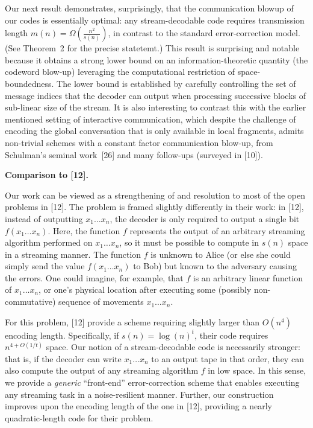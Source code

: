 \documentclass[10pt,a4paper]{article}
\begin{document}
Our next result demonstrates, surprisingly, that the communication blowup of our codes is essentially optimal: any stream-decodable code requires transmission length $m(n)=\Omega\left(\frac{n^{2}}{s(n)}\right)$, in contrast to the standard error-correction model. (See Theorem 2 for the precise statetemt.) This result is surprising and notable because it obtains a strong lower bound on an information-theoretic quantity (the codeword blow-up) leveraging the computational restriction of space-boundedness. The lower bound is established by carefully controlling the set of message indices that the decoder can output when processing successive blocks of sub-linear size of the stream. It is also interesting to contrast this with the earlier mentioned setting of interactive communication, which despite the challenge of encoding the global conversation that is only available in local fragments, admits non-trivial schemes with a constant factor communication blow-up, from Schulman’s seminal work [26] and many follow-ups (surveyed in [10]).\par





\par\medskip\noindent\textbf{Comparison to [12].}\par




Our work can be viewed as a strengthening of and resolution to most of the open problems in [12].
The problem is framed slightly differently in their work: in [12], instead of outputting $x_{1}\ldots x_{n}$, the decoder is only required to output a single bit $f(x_{1}\ldots x_{n})$. Here, the function $f$ represents the output of an arbitrary streaming algorithm performed on $x_{1}\ldots x_{n}$, so it must be possible to compute in $s(n)$ space in a streaming manner. The function $f$ is unknown to Alice (or else she could simply send the value $f(x_{1}\ldots x_{n})$ to Bob) but known to the adversary causing the errors. One could imagine, for example, that $f$ is an arbitrary linear function of $x_{1}\ldots x_{n}$, or one’s physical location after executing some (possibly non-commutative) sequence of movements $x_{1}\ldots x_{n}$.\par




For this problem, [12] provide a scheme requiring slightly larger than $O(n^{4})$ encoding length. Specifically, if $s(n)=\log(n)^{t}$, their code requires $n^{4+O(1/t)}$ space. Our notion of a stream-decodable code is necessarily stronger: that is, if the decoder can write $x_{1}\ldots x_{n}$ to an output tape in that order, they can also compute the output of any streaming algorithm $f$ in low space. In this sense, we provide a \emph{generic} “front-end” error-correction scheme that enables executing any streaming task in a noise-resilient manner. Further, our construction improves upon the encoding length of the one in [12], providing a nearly quadratic-length code for their problem.\par
\end{document}

